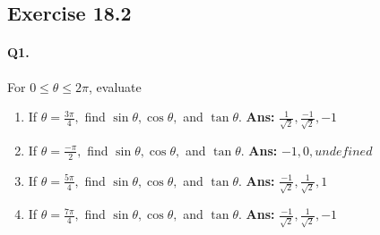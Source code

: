 \documentclass{article}
\begin{document}
\subsection {Exercise 18.2}
\paragraph{Q1.}
For $0\leq\theta\leq2\pi$, evaluate

\begin{enumerate}[label=\alph*)]
  \item If $\theta=\frac{3\pi}{4},$ find $\sin\theta, \cos\theta,$ and $\tan\theta$. {\scriptsize \textbf{Ans:}} $\frac{1}{\sqrt{2}}, \frac{-1}{\sqrt{2}}, -1$
  \item If $\theta=\frac{-\pi}{2},$ find $\sin\theta, \cos\theta,$ and $\tan\theta$. {\scriptsize \textbf{Ans:}} $-1, 0, undefined$
  \item If $\theta=\frac{5\pi}{4},$ find $\sin\theta, \cos\theta,$ and $\tan\theta$. {\scriptsize \textbf{Ans:}} $\frac{-1}{\sqrt{2}}, \frac{1}{\sqrt{2}}, 1$
  \item If $\theta=\frac{7\pi}{4},$ find $\sin\theta, \cos\theta,$ and $\tan\theta$. {\scriptsize \textbf{Ans:}} $\frac{-1}{\sqrt{2}}, \frac{1}{\sqrt{2}}, -1$
\end{enumerate}
\end{document}
